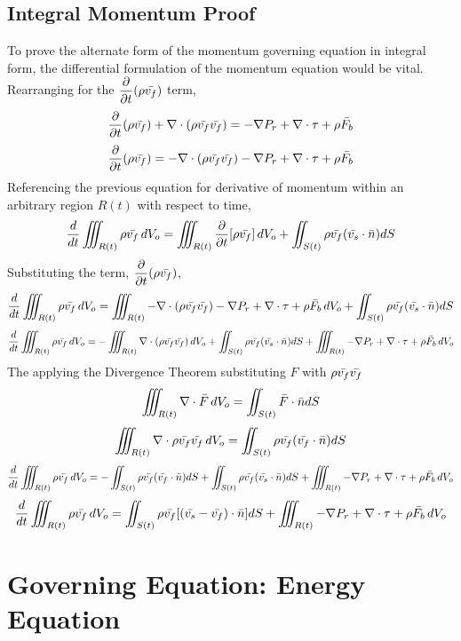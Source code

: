 \documentclass[a4paper, 12pt]{report}
\begin{document}
\begin{center}
\subsection{Integral Momentum Proof}
\begin{comment}
\end{comment}
To prove the alternate form of the momentum governing equation in integral form, the differential formulation of the momentum equation would be vital. Rearranging for the $\displaystyle{\frac{\partial}{\partial t} (\rho \bar{v_f})}$ term,
$$\frac{\partial}{\partial t} (\rho \bar{v_f}) + \nabla \cdot (\rho\bar{v_f}\bar{v_f}) = -\nabla P_r + \nabla \cdot \tau + \rho \bar{F_b}$$
$$\frac{\partial}{\partial t} (\rho \bar{v_f}) = - \nabla \cdot (\rho\bar{v_f}\bar{v_f}) -\nabla P_r + \nabla \cdot \tau + \rho \bar{F_b}$$
Referencing the previous equation for derivative of momentum within an arbitrary region $R(t)$ with respect to time,
$$\frac{d}{dt}\iiint_{R(t)}\rho \bar{v_f} \,dV_o = \iiint_{R(t)}\frac{\partial}{\partial t}[\rho \bar{v_f}]\,dV_o + \iint_{S(t)}\rho \bar{v_f}(\bar{v_s}\cdot\bar{n})dS$$
Substituting the term, $\displaystyle{\frac{\partial}{\partial t} (\rho \bar{v_f})}$,
$$\frac{d}{dt}\iiint_{R(t)}\rho \bar{v_f} \,dV_o = \iiint_{R(t)}- \nabla \cdot (\rho\bar{v_f}\bar{v_f}) -\nabla P_r + \nabla \cdot \tau + \rho \bar{F_b}\,dV_o + \iint_{S(t)}\rho \bar{v_f}(\bar{v_s}\cdot\bar{n})dS$$
$$\frac{d}{dt}\iiint_{R(t)}\rho \bar{v_f} \,dV_o = -\iiint_{R(t)} \nabla \cdot (\rho\bar{v_f}\bar{v_f})\,dV_o + \iint_{S(t)}\rho \bar{v_f}(\bar{v_s}\cdot\bar{n})dS + \iiint_{R(t)}-\nabla P_r + \nabla \cdot \tau + \rho \bar{F_b}\,dV_o$$
The applying the Divergence Theorem substituting $F$ with $\displaystyle{\rho\bar{v_f}\bar{v_f}}$
$$\iiint_{R(t)}  \nabla \cdot \bar{F} \,dV_o = \iint_{S(t)}\bar{F}\cdot \bar{n}dS$$
$$\iiint_{R(t)}  \nabla \cdot \rho\bar{v_f}\bar{v_f} \,dV_o = \iint_{S(t)}\rho\bar{v_f}(\bar{v_f}\cdot \bar{n})dS$$
$$\frac{d}{dt}\iiint_{R(t)}\rho \bar{v_f} \,dV_o = -\iint_{S(t)}\rho\bar{v_f}(\bar{v_f}\cdot \bar{n})dS + \iint_{S(t)}\rho \bar{v_f}(\bar{v_s}\cdot\bar{n})dS + \iiint_{R(t)}-\nabla P_r + \nabla \cdot \tau + \rho \bar{F_b}\,dV_o$$
$$\frac{d}{dt}\iiint_{R(t)}\rho \bar{v_f} \,dV_o = \iint_{S(t)}\rho \bar{v_f}[(\bar{v_s}-\bar{v_f})\cdot\bar{n}]dS + \iiint_{R(t)}-\nabla P_r + \nabla \cdot \tau + \rho \bar{F_b}\,dV_o$$
\section{Governing Equation: Energy Equation}
\begin{comment}
Governing Equation: Energy Equation
\end{comment}
\end{center}
\end{document}
